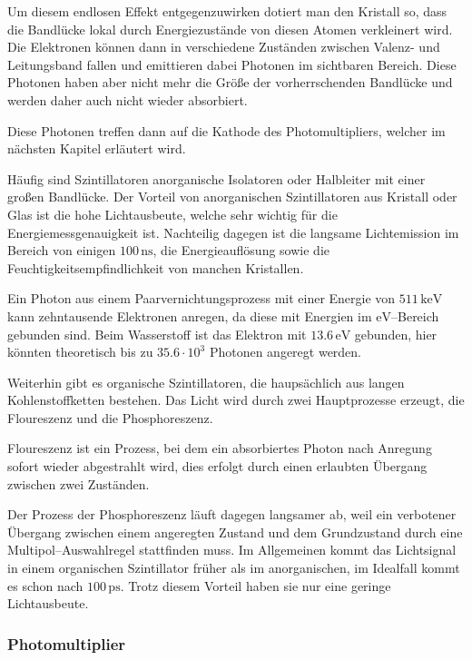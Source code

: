 \documentclass[12pt,a4paper]{scrartcl}
\numberwithin{equation}{section} %
\newcommand{\pu}[1]{\ensuremath{\mathrm{#1}}}
\begin{document}
Um diesem endlosen Effekt entgegenzuwirken dotiert man den Kristall so, dass die Bandlücke lokal durch Energiezustände von diesen Atomen verkleinert wird. Die Elektronen können dann in verschiedene Zuständen zwischen Valenz- und Leitungsband fallen und emittieren dabei Photonen im sichtbaren Bereich. Diese Photonen haben aber nicht mehr die Größe der vorherrschenden Bandlücke und werden daher auch nicht wieder absorbiert.

Diese Photonen treffen dann auf die Kathode des Photomultipliers, welcher im nächsten Kapitel erläutert wird.

Häufig sind Szintillatoren anorganische Isolatoren oder Halbleiter mit einer großen Bandlücke. Der Vorteil von anorganischen Szintillatoren aus Kristall oder Glas ist die hohe Lichtausbeute, welche sehr wichtig für die Energiemessgenauigkeit ist. Nachteilig dagegen ist die langsame Lichtemission im Bereich von einigen $\pu{100\, ns}$, die Energieauflösung sowie die Feuchtigkeitsempfindlichkeit von manchen Kristallen.

Ein Photon aus einem Paarvernichtungsprozess mit einer Energie von $\pu{511\,keV}$ kann zehntausende Elektronen anregen, da diese mit Energien im $\pu{eV}$--Bereich gebunden sind. Beim Wasserstoff ist das Elektron mit $\pu{13.6\,eV}$ gebunden, hier könnten theoretisch bis zu $35.6\cdot 10^3$ Photonen angeregt werden.

Weiterhin gibt es organische Szintillatoren, die haupsächlich aus langen Kohlenstoffketten bestehen. Das Licht wird durch zwei Hauptprozesse erzeugt, die Floureszenz und die Phosphoreszenz. \cite{LMU}

Floureszenz ist ein Prozess, bei dem ein absorbiertes Photon nach Anregung sofort wieder abgestrahlt wird, dies erfolgt durch einen erlaubten Übergang zwischen zwei Zuständen. \cite{LMU}

Der Prozess der Phosphoreszenz läuft dagegen langsamer ab, weil ein verbotener Übergang zwischen einem angeregten Zustand und dem Grundzustand durch eine Multipol--Auswahlregel stattfinden muss. Im Allgemeinen kommt das Lichtsignal in einem organischen Szintillator früher als im anorganischen, im Idealfall kommt es schon nach $\pu{100\, ps}$. Trotz diesem Vorteil haben sie nur eine geringe Lichtausbeute. \cite{LMU}

\hypertarget{photomultiplier}{%
\subsubsection{Photomultiplier}\label{photomultiplier}}
\end{document}
